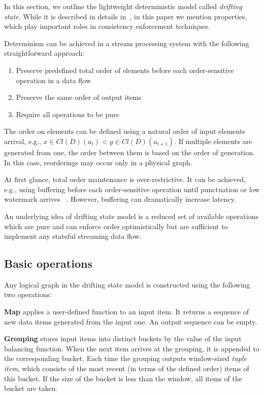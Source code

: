
\label {fs-model-section}

In this section, we outline the lightweight deterministic model called {\em drifting state}. While it is described in details in~\cite{we2018adbis}, in this paper we mention properties, which play important roles in consistency enforcement techniques.

Determinism can be achieved in a stream processing system with the following straightforward approach:
\begin{enumerate}
    \item Preserve predefined total order of elements before each order-sensitive operation in a data flow
    \item Preserve the same order of output items
    \item Require all operations to be pure
\end{enumerate}

The order on elements can be defined using a natural order of input elements arrival, e.g., $x\in Cl(D)(a_t) < y\in Cl(D)(a_{t+1})$. If multiple elements are generated from one, the order between them is based on the order of generation. In this case, reorderings may occur only in a physical graph.

At first glance, total order maintenance is over-restrictive. It can be achieved, e.g., using buffering before each order-sensitive operation until punctuation or low watermark arrives ~\cite{Li:2008:OPN:1453856.1453890}. However, buffering can dramatically increase latency.

An underlying idea of drifting state model is a reduced set of available operations which are pure and can enforce order optimistically but are sufficient to implement any stateful streaming data flow. 
\subsection{Basic operations}

Any logical graph in the drifting state model is constructed using the following two operations:

{\bf Map} applies a user-defined function to an input item. It returns a sequence of new data items generated from the input one. An output sequence can be empty.

{\bf Grouping} stores input items into distinct buckets by the value of the input balancing function. When the next item arrives at the grouping, it is appended to the corresponding bucket. Each time the grouping outputs window-sized {\it tuple item}, which consists of the most recent (in terms of the defined order) items of this bucket. If the size of the bucket is less than the window, all items of the bucket are taken.

